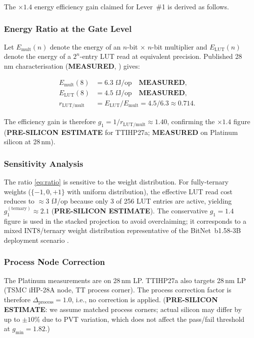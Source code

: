 The \(\times 1.4\) energy efficiency gain claimed for Lever~\#1 is derived as
follows.

\subsubsection{Energy Ratio at the Gate Level}

Let \(E_{\mathrm{mult}}(n)\) denote the energy of an \(n\)-bit × \(n\)-bit
multiplier and \(E_{\mathrm{LUT}}(n)\) denote the energy of a \(2^{n}\)-entry
LUT read at equivalent precision.  Published 28\,nm characterisation
(\textbf{MEASURED}, \cite{platinum_lut_pe_2026}) gives:

\begin{align}
  E_{\mathrm{mult}}(8) &= 6.3\text{ fJ/op} \quad \textbf{MEASURED}, \label{eq:emult}\\
  E_{\mathrm{LUT}}(8)  &= 4.5\text{ fJ/op} \quad \textbf{MEASURED}, \label{eq:elut}\\
  r_{\mathrm{LUT/mult}} &= E_{\mathrm{LUT}} / E_{\mathrm{mult}} = 4.5/6.3 \approx 0.714. \label{eq:ratio}
\end{align}

The efficiency gain is therefore \(g_{1} = 1/r_{\mathrm{LUT/mult}} \approx 1.40\),
confirming the \(\times 1.4\) figure (\textbf{PRE-SILICON ESTIMATE} for TTIHP27a;
\textbf{MEASURED} on Platinum silicon at 28\,nm).

\subsubsection{Sensitivity Analysis}

The ratio \eqref{eq:ratio} is sensitive to the weight distribution.  For
fully-ternary weights (\(\{-1,0,+1\}\) with uniform distribution), the
effective LUT read cost reduces to \(\approx 3\) fJ/op because only 3 of 256
LUT entries are active, yielding \(g_{1}^{(\mathrm{ternary})} \approx 2.1\)
(\textbf{PRE-SILICON ESTIMATE}).  The conservative \(g_{1} = 1.4\) figure is
used in the stacked projection to avoid overclaiming; it corresponds to a
mixed INT8/ternary weight distribution representative of the BitNet~b1.58-3B
deployment scenario \cite{bitnet_b158_2024}.

\subsubsection{Process Node Correction}

The Platinum measurements are on 28\,nm LP.  TTIHP27a also targets 28\,nm LP
(TSMC iHP-28A node, TT process corner).  The process correction factor is
therefore \(\Delta_{\mathrm{process}} = 1.0\), i.e., no correction is applied.
(\textbf{PRE-SILICON ESTIMATE}: we assume matched process corners; actual
silicon may differ by up to \(\pm 10\%\) due to PVT variation, which does not
affect the pass/fail threshold at \(g_{\min} = 1.82\).)

